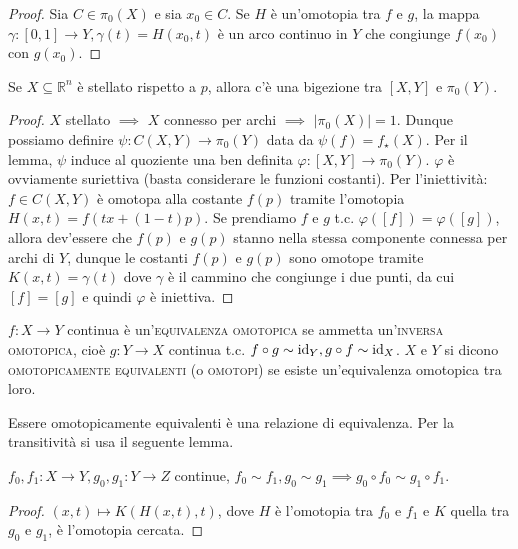 \begin{proof}
  Sia $C \in \pi_0(X)$ e sia $x_0 \in C$. Se $H$ è un'omotopia tra $f$ e $g$, la mappa $\gamma:[0, 1] \longrightarrow Y, \gamma(t)=H(x_0, t)$ è un arco continuo in $Y$ che congiunge $f(x_0)$ con $g(x_0)$.
\end{proof}

\begin{ftt}
  Se $X \subseteq \mathbb{R}^n$ è stellato rispetto a $p$, allora c'è una bigezione tra $[X, Y]$ e $\pi_0(Y)$.
\end{ftt}

\begin{proof}
  $X$ stellato $\implies$ $X$ connesso per archi $\implies$ $|\pi_0(X)|=1$. Dunque possiamo definire $\psi:C(X, Y) \longrightarrow \pi_0(Y)$ data da $\psi(f)=f_{\star}(X)$. Per il lemma, $\psi$ induce al quoziente una ben definita $\varphi:[X, Y] \longrightarrow \pi_0(Y)$. $\varphi$ è ovviamente suriettiva (basta considerare le funzioni costanti). Per l'iniettività: $f \in C(X, Y)$ è omotopa alla costante $f(p)$ tramite l'omotopia $H(x, t)=f(tx+(1-t)p)$.
  Se prendiamo $f$ e $g$ t.c. $\varphi([f])=\varphi([g])$, allora dev'essere che $f(p)$ e $g(p)$ stanno nella stessa componente connessa per archi di $Y$, dunque le costanti $f(p)$ e $g(p)$ sono omotope tramite $K(x, t)=\gamma(t)$ dove $\gamma$ è il cammino che congiunge i due punti, da cui $[f]=[g]$ e quindi $\varphi$ è iniettiva.
\end{proof}

\begin{defn}
  $f:X \longrightarrow Y$ continua è un'\textsc{equivalenza omotopica} se ammetta un'\textsc{inversa omotopica}, cioè $g:Y \longrightarrow X$ continua t.c. $f \circ g \sim \operatorname{id}_Y, g \circ f \sim \operatorname{id}_X$. $X$ e $Y$ si dicono \textsc{omotopicamente equivalenti} (o \textsc{omotopi}) se esiste un'equivalenza omotopica tra loro.
\end{defn}

\begin{exc}
  Essere omotopicamente equivalenti è una relazione di equivalenza. Per la transitività si usa il seguente lemma.
\end{exc}

\begin{lm}
  $f_0, f_1:X \longrightarrow Y, g_0, g_1:Y \longrightarrow Z$ continue, $f_0 \sim f_1, g_0 \sim g_1 \implies g_0 \circ f_0 \sim g_1 \circ f_1$.
\end{lm}

\begin{proof}
  $(x, t) \longmapsto K(H(x, t), t)$, dove $H$ è l'omotopia tra $f_0$ e $f_1$ e $K$ quella tra $g_0$ e $g_1$, è l'omotopia cercata.
\end{proof}

